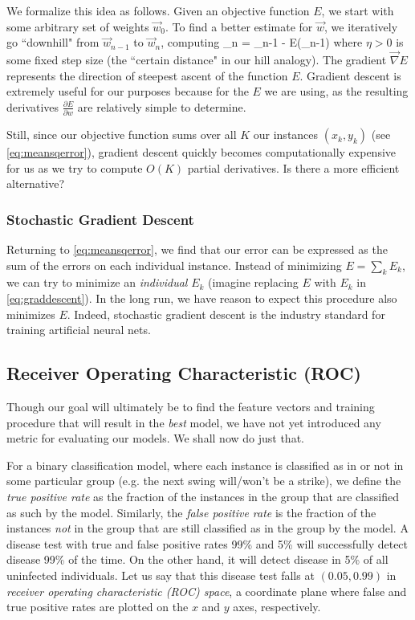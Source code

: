 \documentclass[10pt]{article}
\begin{document}
We formalize this idea as follows.
Given an objective function $E$, we start with some arbitrary set of weights $\vec{w}_0$.
To find a better estimate for $\vec{w}$, we iteratively go ``downhill" from $\vec{w}_{n-1}$ to $\vec{w}_{n}$, computing
\beq
\label{eq:graddescent}
_n = _{n-1} - \eta\vec{\nabla} E(_{n-1})
\eeq
where $\eta > 0$ is some fixed step size (the ``certain distance" in our hill analogy).
The gradient $\vec{\nabla} E$ represents the direction of steepest ascent of the function $E$.
Gradient descent is extremely useful for our purposes because for the $E$ we are using, as the resulting derivatives $\frac{\partial E}{\partial w}$ are relatively simple to determine.

Still, since our objective function sums over all $K$ our instances $(x_k, y_k)$ (see \cref{eq:meansqerror}), gradient descent quickly becomes computationally expensive for us as we try to compute $O(K)$ partial derivatives.
Is there a more efficient alternative?

\subsubsection{Stochastic Gradient Descent}

Returning to \cref{eq:meansqerror}, we find that our error can be expressed as the sum of the errors on each individual instance.
Instead of minimizing $E = \sum_k E_k$, we can try to minimize an \emph{individual} $E_k$ (imagine replacing $E$ with $E_k$ in \cref{eq:graddescent}).
In the long run, we have reason to expect this procedure also minimizes $E$.
Indeed, stochastic gradient descent is the industry standard for training artificial neural nets.

\subsection{Receiver Operating Characteristic (ROC)}
\label{subsec:roc}

Though our goal will ultimately be to find the feature vectors and training procedure that will result in the \emph{best} model, we have not yet introduced any metric for evaluating our models.
We shall now do just that.

For a binary classification model, where each instance is classified as in or not in some particular group (e.g. the next swing will/won't be a strike), we define the \emph{true positive rate} as the fraction of the instances in the group that are classified as such by the model.
Similarly, the \emph{false positive rate} is the fraction of the instances \emph{not} in the group that are still classified as in the group by the model.
A disease test with true and false positive rates 99\% and 5\% will successfully detect disease 99\% of the time.
On the other hand, it will detect disease in 5\% of all uninfected individuals.
Let us say that this disease test falls at $(0.05, 0.99)$ in \emph{receiver operating characteristic (ROC) space}, a coordinate plane where false and true positive rates are plotted on the $x$ and $y$ axes, respectively.
\end{document}
